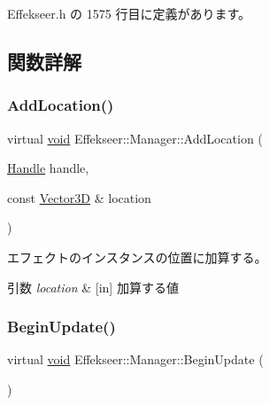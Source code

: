  Effekseer.\+h の 1575 行目に定義があります。



\subsection{関数詳解}
\mbox{\label{class_effekseer_1_1_manager_a8f391814f681fc7acc4e8ed785c80cbc}} 
\subsubsection{\texorpdfstring{Add\+Location()}{AddLocation()}}
{\footnotesize\ttfamily virtual \mbox{\hyperlink{namespace_effekseer_ab34c4088e512200cf4c2716f168deb56}{void}} Effekseer\+::\+Manager\+::\+Add\+Location (\begin{DoxyParamCaption}\item[{\mbox{\hyperlink{namespace_effekseer_afba58b8d812da862190e9bbfc040824a}{Handle}}}]{handle,  }\item[{const \mbox{\hyperlink{struct_effekseer_1_1_vector3_d}{Vector3D}} \&}]{location }\end{DoxyParamCaption})\hspace{0.3cm}{\ttfamily [pure virtual]}}



エフェクトのインスタンスの位置に加算する。 


\begin{DoxyParams}{引数}
{\em location} & \mbox{[}in\mbox{]} 加算する値 \\
\hline
\end{DoxyParams}
\mbox{\label{class_effekseer_1_1_manager_a8b9585b3bee11d4d0d7b29b742178f96}} 
\subsubsection{\texorpdfstring{Begin\+Update()}{BeginUpdate()}}
{\footnotesize\ttfamily virtual \mbox{\hyperlink{namespace_effekseer_ab34c4088e512200cf4c2716f168deb56}{void}} Effekseer\+::\+Manager\+::\+Begin\+Update (\begin{DoxyParamCaption}{ }\end{DoxyParamCaption})\hspace{0.3cm}{\ttfamily [pure virtual]}}



